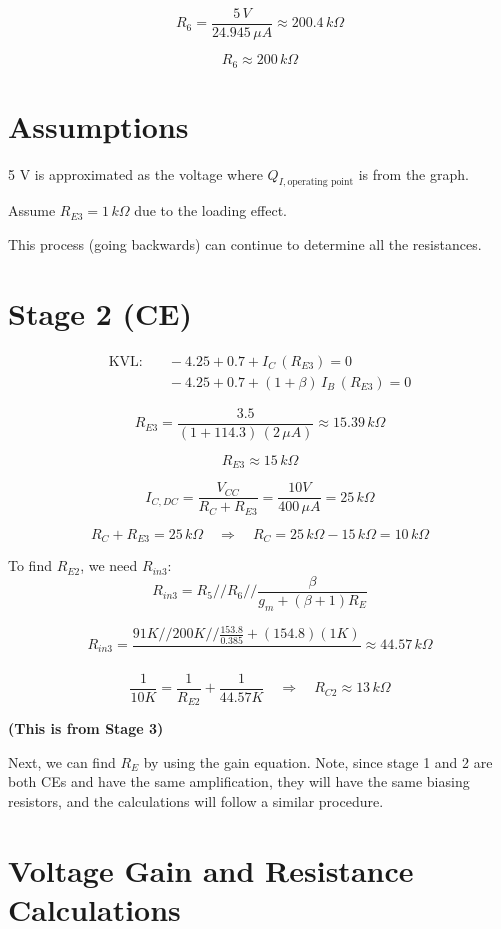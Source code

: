 \[
R_6 = \frac{5 \, V}{24.945 \, \mu A} \approx 200.4 \, k\Omega
\]

\[
R_6 \approx 200 \, k\Omega
\]

\section{Assumptions}
5 V is approximated as the voltage where \(Q_{I, \text{operating point}}\) is from the graph.

Assume \(R_{E3} = 1 \, k\Omega\) due to the loading effect.

This process (going backwards) can continue to determine all the resistances.

\section{Stage 2 (CE)}
\begin{align*}
\text{KVL:} & \quad -4.25 + 0.7 + I_C \, (R_{E3}) = 0 \\
            & \quad -4.25 + 0.7 + (1 + \beta) \, I_B \, (R_{E3}) = 0
\end{align*}

\[
R_{E3} = \frac{3.5}{(1 + 114.3) \, (2 \, \mu A)} \approx 15.39 \, k\Omega
\]

\[
R_{E3} \approx 15 \, k\Omega
\]

\[
I_{C, DC} = \frac{V_{CC}}{R_C + R_{E3}} = \frac{10V}{400 \, \mu A} = 25 \, k\Omega
\]

\[
R_C + R_{E3} = 25 \, k\Omega \quad \Rightarrow \quad R_C = 25 \, k\Omega - 15 \, k\Omega = 10 \, k\Omega
\]

To find \(R_{E2}\), we need \(R_{in3}\):
\[
R_{in3} = R_5 // R_6 // \frac{\beta}{g_m + (\beta + 1)R_E}
\]

\[
R_{in3} = \frac{91K // 200K // \frac{153.8}{0.385} + (154.8)(1K)}{}
\approx 44.57 \, k\Omega
\]

\[
\frac{1}{10K} = \frac{1}{R_{E2}} + \frac{1}{44.57K} \quad \Rightarrow \quad R_{C2} \approx 13 \, k\Omega
\]

\textbf{(This is from Stage 3)}

Next, we can find \(R_E\) by using the gain equation. Note, since stage 1 and 2 are both CEs and have the same amplification, they will have the same biasing resistors, and the calculations will follow a similar procedure.

\section{Voltage Gain and Resistance Calculations}

